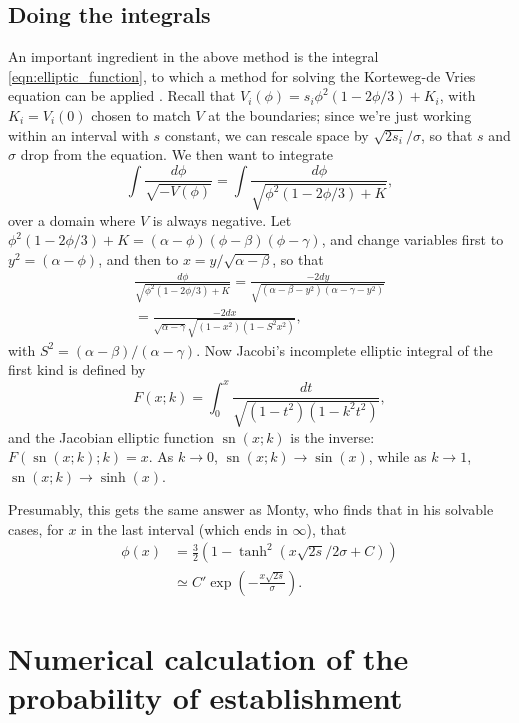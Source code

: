 \documentclass{article}
\DeclareMathOperator{\sn}{sn}
\begin{document}
\subsection{Doing the integrals}
\label{apx:some_integrals}

An important ingredient in the above method is the integral \eqref{eqn:elliptic_function},
to which a method for solving the Korteweg-de Vries equation can be applied \citep{NEQwiki}.
Recall that $V_i(\phi) =  s_i \phi^2(1-2\phi/3) + K_i$, with $K_i = V_i(0)$ chosen to match $V$ at the boundaries;
since we're just working within an interval with $s$ constant, we can rescale space by $\sqrt{2 s_i}/\sigma$,
so that $s$ and $\sigma$ drop from the equation.
We then want to integrate
\[
    \int \frac{ d\phi }{ \sqrt{-V(\phi)} } = 
         \int \frac{ d\phi }{ \sqrt{ \phi^2 (1-2\phi/3) + K } } ,
\]
over a domain where $V$ is always negative.
Let $\phi^2(1-2\phi/3)+K = (\alpha-\phi)(\phi-\beta)(\phi-\gamma)$,
and change variables first to $y^2=(\alpha-\phi)$, 
and then to $x = y/\sqrt{\alpha-\beta}$, so that
\begin{align*}
    \frac{ d\phi }{ \sqrt{ \phi^2 (1-2\phi/3) + K } } 
        = \frac{ - 2 dy }{ \sqrt{ (\alpha-\beta-y^2) (\alpha-\gamma-y^2) } } \\
        = \frac{ - 2 dx }{ \sqrt{\alpha-\gamma} \sqrt{ (1-x^2) (1-S^2 x^2) } } ,
\end{align*}
with $S^2 = (\alpha-\beta)/(\alpha-\gamma)$.
Now Jacobi's incomplete elliptic integral of the first kind is defined by
\[
    F(x;k) = \int_0^x \frac{dt}{\sqrt{ (1-t^2)(1-k^2t^2) }} ,
\]
and the Jacobian elliptic function $\sn(x;k)$ is the inverse: $F(\sn(x;k);k) = x$.
As $k \to 0$, $\sn(x;k) \to \sin(x)$, while as $k \to 1$, $\sn(x;k) \to \sinh(x)$.

Presumably, this gets the same answer as Monty, who finds that in his solvable cases,
for $x$ in the last interval (which ends in $\infty$), that
\begin{align*}
    \phi(x) &= \frac{3}{2}\left( 1 - \tanh^2 ( x \sqrt{2s} / 2 \sigma + C ) \right) \\
        &\simeq C' \exp\left( - \frac{ x \sqrt{2s} }{ \sigma } \right) .
\end{align*}

\section{Numerical calculation of the probability of establishment}
\label{apx:establishment_sims}
\end{document}
